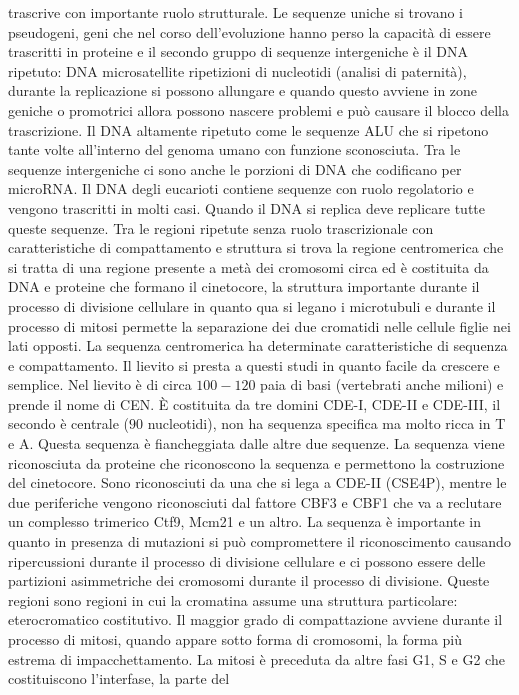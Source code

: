 trascrive con importante ruolo strutturale. Le sequenze uniche si trovano i pseudogeni, geni che nel corso dell'evoluzione hanno perso la capacit\`a di essere trascritti in proteine e 
il secondo gruppo di sequenze intergeniche \`e il DNA ripetuto: DNA microsatellite ripetizioni di nucleotidi (analisi di paternit\`a), durante la replicazione si possono allungare e 
quando questo avviene in zone geniche o promotrici allora possono nascere problemi e pu\`o causare il blocco della trascrizione. Il DNA altamente ripetuto come le sequenze ALU che 
si ripetono tante volte all'interno del genoma umano con funzione sconosciuta. Tra le sequenze intergeniche ci sono anche le porzioni di DNA che codificano per microRNA. Il DNA degli 
eucarioti contiene sequenze con ruolo regolatorio e vengono trascritti in molti casi. Quando il DNA si replica deve replicare tutte queste sequenze. Tra le regioni ripetute senza ruolo
trascrizionale con caratteristiche di compattamento e struttura si trova la regione centromerica che si tratta di una regione presente a met\`a dei cromosomi circa ed \`e costituita da
DNA e proteine che formano il cinetocore, la struttura importante durante il processo di divisione cellulare in quanto qua si legano i microtubuli e durante il processo di mitosi permette
la separazione dei due cromatidi nelle cellule figlie nei lati opposti. La sequenza centromerica ha determinate caratteristiche di sequenza e compattamento. Il lievito si presta a questi
studi in quanto facile da crescere e semplice. Nel lievito \`e di circa $100-120$ paia di basi (vertebrati anche milioni) e prende il nome di CEN. \`E costituita da tre domini CDE-I, 
CDE-II e CDE-III, il secondo \`e centrale ($90$ nucleotidi), non ha sequenza specifica ma molto ricca in T e A. Questa sequenza \`e fiancheggiata dalle altre due sequenze. La sequenza
viene riconosciuta da proteine che riconoscono la sequenza e permettono la costruzione del cinetocore. Sono riconosciuti da una che si lega a CDE-II (CSE4P), mentre le due periferiche
vengono riconosciuti dal fattore CBF3 e CBF1 che va a reclutare un complesso trimerico Ctf9, Mcm21 e un altro. La sequenza \`e importante in quanto in presenza di mutazioni si pu\`o 
compromettere il riconoscimento causando ripercussioni durante il processo di divisione cellulare e ci possono essere delle partizioni asimmetriche dei cromosomi durante il processo di 
divisione. Queste regioni sono regioni in cui la cromatina assume una struttura particolare: eterocromatico costitutivo. Il maggior grado di compattazione avviene durante il processo di 
mitosi, quando appare sotto forma di cromosomi, la forma pi\`u estrema di impacchettamento. La mitosi \`e preceduta da altre fasi G1, S e G2 che costituiscono l'interfase, la parte del 

